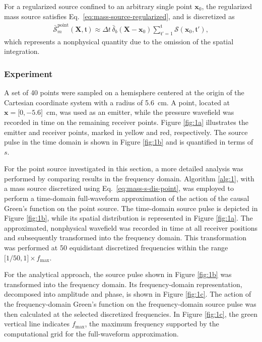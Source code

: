 \documentclass[11pt,reqno]{amsart}
\theoremstyle{remark}
\theoremstyle{italic_lemma}
\newcommand{\bt}{\mathfrak{t}}
\newcommand{\bx}{\boldsymbol{x}}
\newcommand{\bX}{\boldsymbol{X}}
\begin{document}
For a regularized source confined to an arbitrary single point \( \bx_0 \), the regularized mass source satisfies Eq.~\eqref{eq:mass-source-regularized}, and is discretized as
\begin{align}
\label{eq:mass-s-dis-point}
\bar{\mathcal{S}}_m^{\text{point}}(\bX, \bt) \approx \Delta t \, \bar{\delta}_b(\bX - \bx_0) \sum_{\bt' = 1}^{\bt} \mathcal{S}(\bx_0, \bt'),
\end{align}
which represents a nonphysical quantity due to the omission of the spatial integration.


\subsubsection{Experiment}

A set of 40 points were sampled on a hemisphere centered at the origin of the Cartesian coordinate system with a radius of 5.6~cm. A point, located at $\bx = \big[0, -5.6\big]$~cm, was used as an emitter, while the pressure wavefield was recorded in time on the remaining receiver points. Figure \ref{fig:1a} illustrates the emitter and receiver points, marked in yellow and red, respectively. The source pulse in the time domain is shown in Figure \ref{fig:1b} and is quantified in terms of $s$.

For the point source investigated in this section, a more detailed analysis was performed by comparing results in the frequency domain. Algorithm \ref{alg:1}, with a mass source discretized using Eq.~\eqref{eq:mass-s-dis-point}, was employed to perform a time-domain full-waveform approximation of the action of the causal Green's function on the point source. The time-domain source pulse is depicted in Figure \ref{fig:1b}, while its spatial distribution is represented in Figure \ref{fig:1a}. The approximated, nonphysical wavefield was recorded in time at all receiver positions and subsequently transformed into the frequency domain. This transformation was performed at 50 equidistant discretized frequencies within the range $\big[1/50, 1 \big] \times f_\text{max}$.

For the analytical approach, the source pulse shown in Figure \ref{fig:1b} was transformed into the frequency domain. Its frequency-domain representation, decomposed into amplitude and phase, is shown in Figure \ref{fig:1c}. The action of the frequency-domain Green's function on the frequency-domain source pulse was then calculated at the selected discretized frequencies. In Figure \ref{fig:1c}, the green vertical line indicates $f_\text{max}$, the maximum frequency supported by the computational grid for the full-waveform approximation.
\end{document}
